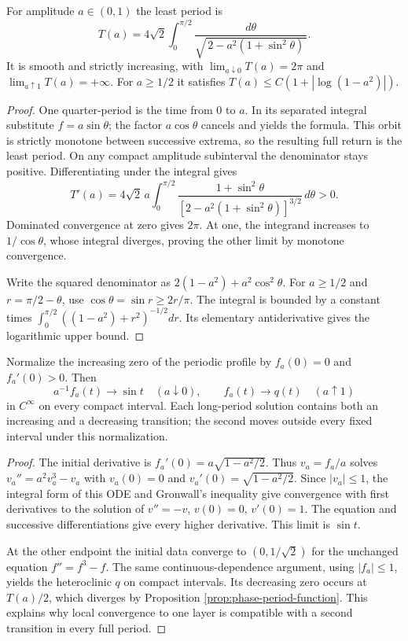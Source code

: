 \begin{proposition}\label{prop:phase-period-function}
For amplitude $a\in(0,1)$ the least period is
\[
 T(a)=4\sqrt2\int_0^{\pi/2}
       \frac{d\theta}{\sqrt{\,2-a^2(1+\sin^2\theta)\,}}.
\]
It is smooth and strictly increasing, with
$\lim_{a\downarrow0}T(a)=2\pi$ and $\lim_{a\uparrow1}T(a)=+\infty$.
For $a\geq1/2$ it satisfies
$T(a)\leq C(1+|\log(1-a^2)|)$.
\end{proposition}
\begin{proof}
One quarter-period is the time from $0$ to $a$. In its separated integral substitute $f=a\sin\theta$; the factor $a\cos\theta$ cancels and yields the formula. This orbit is strictly monotone between successive extrema, so the resulting full return is the least period. On any compact amplitude subinterval the denominator stays positive. Differentiating under the integral gives
\[
 T'(a)=4\sqrt2\,a\int_0^{\pi/2}
 \frac{1+\sin^2\theta}{[2-a^2(1+\sin^2\theta)]^{3/2}}\,d\theta>0.
\]
Dominated convergence at zero gives $2\pi$. At one, the integrand increases to $1/\cos\theta$, whose integral diverges, proving the other limit by monotone convergence.

Write the squared denominator as $2(1-a^2)+a^2\cos^2\theta$. For $a\geq1/2$ and $r=\pi/2-\theta$, use $\cos\theta=\sin r\geq2r/\pi$. The integral is bounded by a constant times $\int_0^{\pi/2}((1-a^2)+r^2)^{-1/2}dr$. Its elementary antiderivative gives the logarithmic upper bound.
\end{proof}

\begin{example}\label{ex:phase-periodic-limits}
Normalize the increasing zero of the periodic profile by $f_a(0)=0$ and $f_a'(0)>0$. Then
\[
 a^{-1}f_a(t)\longrightarrow\sin t\quad(a\downarrow0),\qquad
 f_a(t)\longrightarrow q(t)\quad(a\uparrow1)
\]
in $C^\infty$ on every compact interval. Each long-period solution contains both an increasing and a decreasing transition; the second moves outside every fixed interval under this normalization.
\end{example}
\begin{proof}
The initial derivative is $f_a'(0)=a\sqrt{1-a^2/2}$. Thus $v_a=f_a/a$ solves
$v_a''=a^2v_a^3-v_a$ with $v_a(0)=0$ and $v_a'(0)=\sqrt{1-a^2/2}$. Since $|v_a|\leq1$, the integral form of this ODE and Gronwall's inequality give convergence with first derivatives to the solution of $v''=-v$, $v(0)=0$, $v'(0)=1$. The equation and successive differentiations give every higher derivative. This limit is $\sin t$.

At the other endpoint the initial data converge to $(0,1/\sqrt2)$ for the unchanged equation $f''=f^3-f$. The same continuous-dependence argument, using $|f_a|\leq1$, yields the heteroclinic $q$ on compact intervals. Its decreasing zero occurs at $T(a)/2$, which diverges by Proposition \ref{prop:phase-period-function}. This explains why local convergence to one layer is compatible with a second transition in every full period.
\end{proof}

